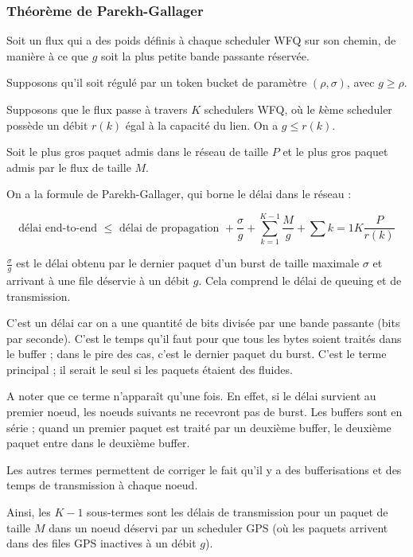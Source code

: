 			\subsubsection{Théorème de Parekh-Gallager}
			
			Soit un flux qui a des poids définis à chaque scheduler WFQ sur son chemin, de manière à ce que $g$ soit la plus petite bande passante réservée.
			
			Supposons qu'il soit régulé par un token bucket de paramètre $(\rho, \sigma)$, avec $g \geq \rho$.
			
			Supposons que le flux passe à travers $K$ schedulers WFQ, où le $k$ème scheduler possède un débit $r(k)$ égal à la capacité du lien. On a $g \leq r(k)$.
			
			Soit le plus gros paquet admis dans le réseau de taille $P$ et le plus gros paquet admis par le flux de taille $M$.
			
			On a la formule de Parekh-Gallager, qui borne le délai dans le réseau :
			
			$$\text{délai end-to-end } \leq  \text{ délai de propagation } + \frac{\sigma}{g} + \sum_{k = 1}^{K - 1} \frac{M}{g} + \sum{k = 1}{K} \frac{P}{r(k)}$$
		
			$\frac{\sigma}{g}$ est le délai obtenu par le dernier paquet d'un burst de taille maximale $\sigma$ et arrivant à une file déservie à un débit $g$. Cela comprend le délai de queuing et de transmission.
			
			C'est un délai car on a une quantité de bits divisée par une bande passante (bits par seconde). C'est le temps qu'il faut pour que tous les bytes soient traités dans le buffer ; dans le pire des cas, c'est le dernier paquet du burst. C'est le terme principal ; il serait le seul si les paquets étaient des fluides.
			
			A noter que ce terme n'apparaît qu'une fois. En effet, si le délai survient au premier noeud, les noeuds suivants ne recevront pas de burst. Les buffers sont en série ; quand un premier paquet est traité par un deuxième buffer, le deuxième paquet entre dans le deuxième buffer.			
			
			Les autres termes permettent de corriger le fait qu'il y a des bufferisations et des temps de transmission à chaque noeud.
			
			Ainsi, les $K - 1$ sous-termes sont les délais de transmission pour un paquet de taille $M$ dans un noeud déservi par un scheduler GPS (où les paquets arrivent dans des files GPS inactives à un débit $g$).
			

